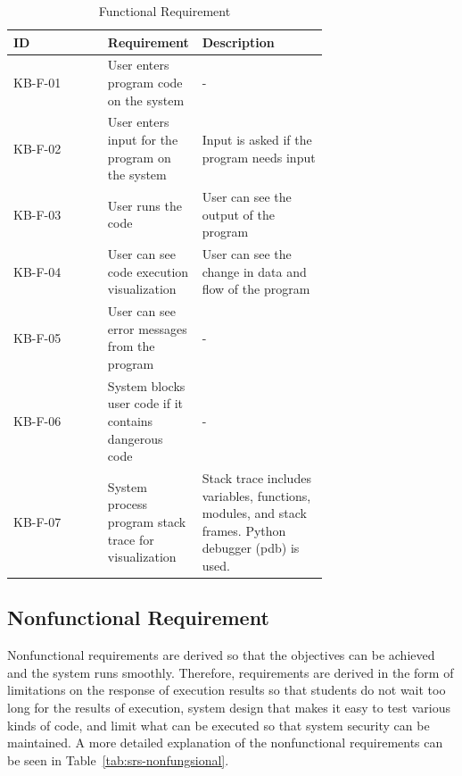 \documentclass[conference]{IEEEtran}
\begin{document}
\begin{table}[htbp]
  \caption{Functional Requirement}
  \begin{center}
    \begin{tabular}{|l|p{0.3\linewidth}|p{0.4\linewidth}|}
      \hline
      \textbf{ID} & \textbf{Requirement}                                  & \textbf{Description}                                                                                 \\ \hline
      KB-F-01     & User enters program code on the system                & -                                                                                                    \\ \hline
      KB-F-02     & User enters input for the program on the system       & Input is asked if the program needs input                                                            \\ \hline
      KB-F-03     & User runs the code                                    & User can see the output of the program                                                               \\ \hline
      KB-F-04     & User can see code execution visualization             & User can see the change in data and flow of the program                                              \\ \hline
      KB-F-05     & User can see error messages from the program          & -                                                                                                    \\ \hline
      KB-F-06     & System blocks user code if it contains dangerous code & -                                                                                                    \\ \hline
      KB-F-07     & System process program stack trace for visualization  & Stack trace includes variables, functions, modules, and stack frames. Python debugger (pdb) is used. \\ \hline
    \end{tabular}
    \label{tab:srs-fungsional}
  \end{center}
\end{table}

\subsection{Nonfunctional Requirement}
Nonfunctional requirements are derived so that the objectives can be achieved and the system runs smoothly. Therefore, requirements are derived in the form of limitations on the response of execution results so that students do not wait too long for the results of execution, system design that makes it easy to test various kinds of code, and limit what can be executed so that system security can be maintained. A more detailed explanation of the nonfunctional requirements can be seen in Table~\ref{tab:srs-nonfungsional}.
\end{document}
